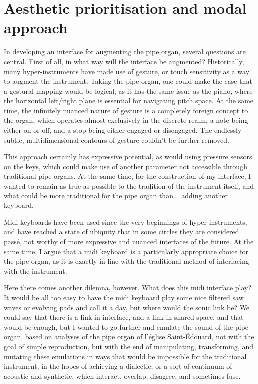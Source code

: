 \documentclass[12pt,twoside,maitrise]{dms_ks}
\theoremstyle{definition}
\begin{document}
\section{Aesthetic prioritisation and modal approach}

In developing an interface for augmenting the pipe organ, several questions are central.
First of all, in what way will the interface be augmented?
Historically, many hyper-instruments have made use of gesture, or touch sensitivity as a way to augment the instrument.
Taking the pipe organ, one could make the case that a gestural mapping would be logical, as it has the same issue as the piano, where the horizontal left/right plane is essential for navigating pitch space.
At the same time, the infinitely nuanced nature of gesture is a completely foreign concept to the organ, which operates almost exclusively in the discrete realm, a note being either on or off, and a stop being either engaged or disengaged.
The endlessly subtle, multidimensional contours of gesture couldn't be further removed.

This approach certainly has expressive potential, as would using pressure sensors on the keys, which could make use of another parameter not accessible through traditional pipe-organs.
At the same time, for the construction of my interface, I wanted to remain as true as possible to the tradition of the instrument itself, and what could be more traditional for the pipe organ than... adding another keyboard.

Midi keyboards have been used since the very beginnings of hyper-instruments, and have reached a state of ubiquity that in some circles they are considered passé, not worthy of more expressive and nuanced interfaces of the future.
At the same time, I argue that a midi keyboard is a particularly appropriate choice for the pipe organ, as it is exactly in line with the traditional method of interfacing with the instrument.

Here there comes another dilemna, however.
What does this midi interface play?
It would be all too easy to have the midi keyboard play some nice filtered saw waves or evolving pads and call it a day, but where would the sonic link be?
We could say that there is a link in interface, and a link in shared space, and that would be enough, but I wanted to go further and emulate the sound of the pipe-organ, based on analyses of the pipe organ of l'église Saint-Édouard, not with the goal of simple reproduction, but with the end of manipulating, transforming, and mutating these emulations in ways that would be impossible for the traditional instrument, in the hopes of achieving a dialectic, or a sort of continuum of acoustic and synthetic, which interact, overlap, disagree, and sometimes fuse.
\end{document}
